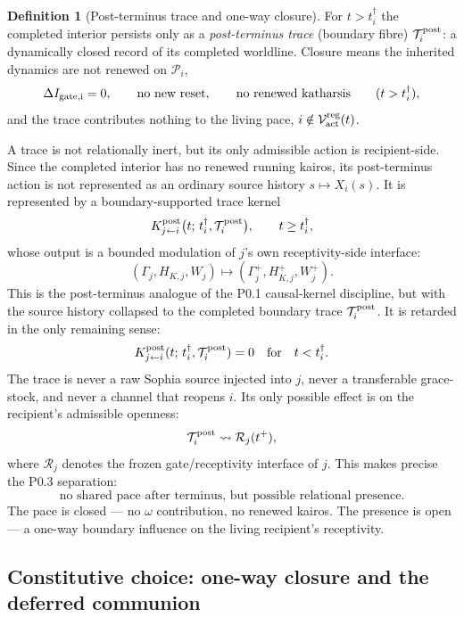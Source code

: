\documentclass[11pt,a4paper]{article}
\theoremstyle{definition}
\newtheorem{definition}{Definition}[section]
\theoremstyle{plain}
\theoremstyle{remark}
\begin{document}
\begin{definition}[Post-terminus trace and one-way closure]\label{def:trace}
For \(t>t_i^\dagger\) the completed interior persists only as a \emph{post-terminus
trace} (boundary fibre) \(\mathcal T_i^{\rm post}\): a dynamically closed record of its
completed worldline. Closure means the inherited dynamics are not renewed on
\(\mathcal P_i\),
\[
\Delta I_{\rm gate,i}=0,\qquad
\text{no new reset},\qquad
\text{no renewed katharsis}
\qquad(t>t_i^\dagger),
\]
and the trace contributes nothing to the living pace,
\(i\notin\mathcal V_{\rm act}^{\rm reg}(t)\).
\end{definition}

A trace is not relationally inert, but its only admissible action is
recipient-side. Since the completed interior has no renewed running kairos, its
post-terminus action is not represented as an ordinary source history
\(s\mapsto X_i(s)\). It is represented by a boundary-supported trace kernel
\[
K^{\rm post}_{j\leftarrow i}
\bigl(t;\,t_i^\dagger,\mathcal T_i^{\rm post}\bigr),
\qquad
t\geq t_i^\dagger,
\]
whose output is a bounded modulation of \(j\)'s own receptivity-side interface:
\[
(\Gamma_j,H_{K,j},W_j)
\longmapsto
(\Gamma_j^+,H_{K,j}^+,W_j^+).
\]
This is the post-terminus analogue of the P0.1 causal-kernel discipline, but with
the source history collapsed to the completed boundary trace
\(\mathcal T_i^{\rm post}\). It is retarded in the only remaining sense:
\[
K^{\rm post}_{j\leftarrow i}(t;\,t_i^\dagger,\mathcal T_i^{\rm post})=0
\quad\text{for}\quad
t<t_i^\dagger.
\]
The trace is never a raw Sophia source injected into \(j\), never a transferable
grace-stock, and never a channel that reopens \(i\). Its only possible effect is on
the recipient's admissible openness:
\[
\mathcal T_i^{\rm post}
\leadsto
\mathcal R_j(t^+),
\]
where \(\mathcal R_j\) denotes the frozen gate/receptivity interface of \(j\). This
makes precise the P0.3 separation:
\[
\boxed{\text{no shared pace after terminus, but possible relational presence.}}
\]
The pace is closed --- no \(\omega\) contribution, no renewed kairos. The presence is
open --- a one-way boundary influence on the living recipient's receptivity.

\subsection{Constitutive choice: one-way closure and the deferred communion}
\end{document}
